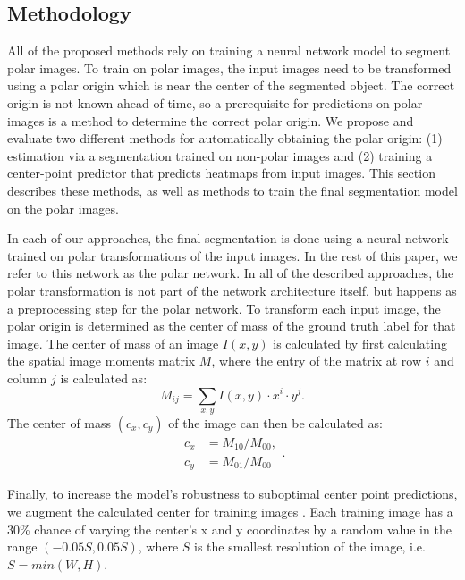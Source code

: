   \subsection{Methodology}
  
All of the proposed methods rely on training a neural network model to segment polar images. To train on 
polar images, the input images need to be transformed using a polar origin which is near the center of 
the 
segmented object. The correct origin is not known ahead of time, so a prerequisite for predictions on polar
images is a method to determine the correct polar origin. We propose and 
evaluate two different methods for automatically obtaining the polar origin: (1)
estimation via a segmentation trained on non-polar images and (2) training a center-point predictor that predicts heatmaps from input images. 
This section describes these methods, as well as methods to train the 
final segmentation model on the polar images.
      
In each of our approaches, the final segmentation is done using a neural network trained on polar 
transformations of the input images. In the rest of this paper, we refer to this network as the polar 
network. In all of the described approaches, the polar transformation is not part of the network architecture itself, but happens as a preprocessing step for the polar network.
To transform each input image, the polar origin is determined as the center of mass of the 
ground truth label for that image. The center of mass of an image $I(x, y)$ is calculated by first 
calculating the spatial image moments matrix $M$, where the entry of the matrix at row $i$ and column $j$ is calculated as:
  \begin{equation}
    M_{ij}= \sum _{x,y} I(x,y) \cdot x^i \cdot y^j.
    \label{eq:moments}
  \end{equation}
The center of mass $(c_x, c_y)$ of the image can then be calculated as:
  \begin{equation}
    \begin{aligned}
      c_x &= M_{10} / M_{00}, \\
      c_y &= M_{01} / M_{00}
    \end{aligned}.
    \label{eq:center-mass}
  \end{equation}

Finally, to increase the model's robustness to suboptimal center point predictions, we augment the 
calculated center for training images \cite{estevesPolarTransformerNetworks2018a}. Each training image has 
a 30\% chance of varying the center's x and y coordinates by a random value in the range $(-0.05S, 
0.05S)$, where $S$ is the smallest resolution of the image, i.e. $S = min(W, H)$.
 
